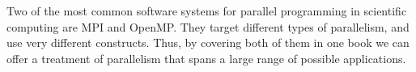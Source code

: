 Two of the most common software systems for parallel programming
in scientific computing are MPI and OpenMP.
They target different types of parallelism,
and use very different constructs. 
Thus, by covering both of them in one book
we can offer a treatment of parallelism that
spans a large range of possible applications.

